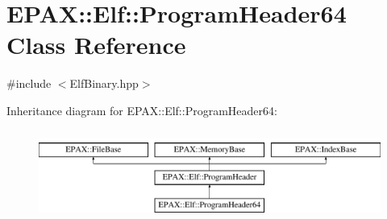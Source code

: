 \hypertarget{class_e_p_a_x_1_1_elf_1_1_program_header64}{\section{\-E\-P\-A\-X\-:\-:\-Elf\-:\-:\-Program\-Header64 \-Class \-Reference}
\label{class_e_p_a_x_1_1_elf_1_1_program_header64}
}


{\ttfamily \#include $<$\-Elf\-Binary.\-hpp$>$}

\-Inheritance diagram for \-E\-P\-A\-X\-:\-:\-Elf\-:\-:\-Program\-Header64\-:\begin{figure}[H]
\begin{center}
\leavevmode
\includegraphics[height=3.000000cm]{class_e_p_a_x_1_1_elf_1_1_program_header64}
\end{center}
\end{figure}
